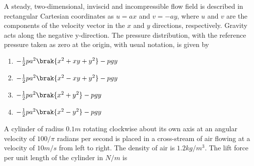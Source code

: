     \item A steady, two-dimensional, inviscid and incompressible flow field is described in rectangular Cartesian coordinates as $u = ax$ and $v=-ay$, where $u$ and $v$ are the components of the velocity vector in the $x$ and $y$ directions, respectively. Gravity acts along the negative y-direction. The pressure distribution, with the reference pressure taken as zero at the origin, with usual notation, is given by
    \begin{multicols}{2}
        \begin{enumerate}
            \item $-\frac{1}{2}p a^2 \brak{x^2 +xy +y^2} - pgy$
            \item $-\frac{1}{2}p a^2 \brak{x^2 -xy +y^2} - pgy$
            \item $-\frac{1}{2}p a^2 \brak{x^2 +y^2} - pgy$
            \item $-\frac{1}{2}p a^2 \brak{x^2 - y^2} - pgy$
        \end{enumerate}
    \end{multicols}

    
    \item A cylinder of radius $0.1 m$ rotating clockwise about its own axis at an angular velocity of $100/\pi$ radians per second is placed in a cross-stream of air flowing at a velocity of $10 m/s$ from left to right. The density of air is $1.2 kg/m^3$. The lift force per unit length of the cylinder in $N/m$ is

